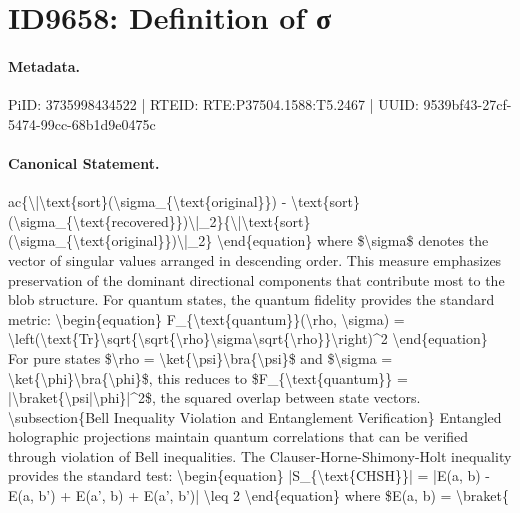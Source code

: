 \section*{ID9658: Definition of σ}
\paragraph{Metadata.}
PiID: 3735998434522 | RTEID: RTE:P37504.1588:T5.2467 | UUID: 9539bf43-27cf-5474-99cc-68b1d9e0475c

\paragraph{Canonical Statement.}
ac\{\textbackslash{}|\textbackslash{}text\{sort\}(\textbackslash{}sigma\_\{\textbackslash{}text\{original\}\}) - \textbackslash{}text\{sort\}(\textbackslash{}sigma\_\{\textbackslash{}text\{recovered\}\})\textbackslash{}|\_2\}\{\textbackslash{}|\textbackslash{}text\{sort\}(\textbackslash{}sigma\_\{\textbackslash{}text\{original\}\})\textbackslash{}|\_2\} \textbackslash{}end\{equation\} where \$\textbackslash{}sigma\$ denotes the vector of singular values arranged in descending order. This measure emphasizes preservation of the dominant directional components that contribute most to the blob structure. For quantum states, the quantum fidelity provides the standard metric: \textbackslash{}begin\{equation\} F\_\{\textbackslash{}text\{quantum\}\}(\textbackslash{}rho, \textbackslash{}sigma) = \textbackslash{}left(\textbackslash{}text\{Tr\}\textbackslash{}sqrt\{\textbackslash{}sqrt\{\textbackslash{}rho\}\textbackslash{}sigma\textbackslash{}sqrt\{\textbackslash{}rho\}\}\textbackslash{}right)\textasciicircum{}2 \textbackslash{}end\{equation\} For pure states \$\textbackslash{}rho = \textbackslash{}ket\{\textbackslash{}psi\}\textbackslash{}bra\{\textbackslash{}psi\}\$ and \$\textbackslash{}sigma = \textbackslash{}ket\{\textbackslash{}phi\}\textbackslash{}bra\{\textbackslash{}phi\}\$, this reduces to \$F\_\{\textbackslash{}text\{quantum\}\} = |\textbackslash{}braket\{\textbackslash{}psi|\textbackslash{}phi\}|\textasciicircum{}2\$, the squared overlap between state vectors. \textbackslash{}subsection\{Bell Inequality Violation and Entanglement Verification\} Entangled holographic projections maintain quantum correlations that can be verified through violation of Bell inequalities. The Clauser-Horne-Shimony-Holt inequality provides the standard test: \textbackslash{}begin\{equation\} |S\_\{\textbackslash{}text\{CHSH\}\}| = |E(a, b) - E(a, b') + E(a', b) + E(a', b')| \textbackslash{}leq 2 \textbackslash{}end\{equation\} where \$E(a, b) = \textbackslash{}braket\{

